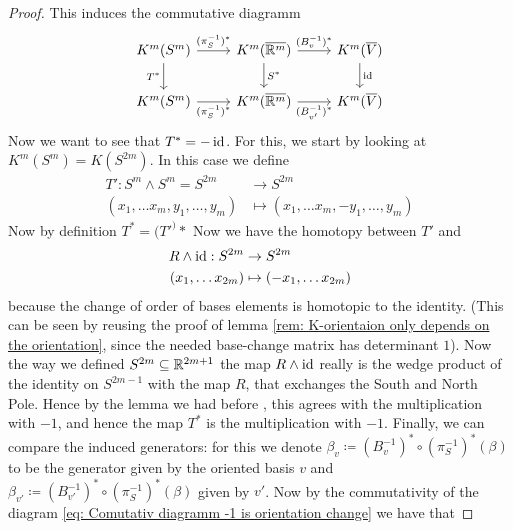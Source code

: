 \begin{proof}
    This induces the commutative diagramm 
    \begin{equation} \label{eq: Comutativ diagramm -1 is orientation change}
\begin{tikzcd}
K^m(S^m) \arrow[d, "T^*"'] \arrow[r, "(\pi_S^{-1})^*"] & K^m(\overline{\R^m}) \arrow[d, "S^*"] \arrow[r, "(B_{v}^{-1})^*"] & K^m(\overline{V}) \arrow[d, "\id"] \\
K^m(S^m) \arrow[r, "(\pi_S^{-1})^*"']                  & K^m(\overline{\R^m}) \arrow[r, "(B_{v'}^{-1})^*"']                & K^m(\overline{V})                 
\end{tikzcd}
    \end{equation}
Now we want to see that $T^*=-\operatorname{\mathrm{id}}$.
For this, we start by looking at $K^m(S^m)=K(S^{2m})$. In this case we define 
\begin{align*}
    T': S^m\wedge S^m =S^{2m}       & \to S^{2m}\\
    (x_1,\dots x_m,y_1,\dots, y_m)  & \mapsto (x_1,\dots x_m,-y_1,\dots, y_m)
\end{align*} Now by definition $T^*=(T'^)*$
Now we have the homotopy between $T'$ and 
\begin{align*}
    R\wedge \operatorname{\mathrm{id}} :S^{2m} & \to       S^{2m}\\
    (x_1,\dots x_{2m})  & \mapsto   (-x_1,\dots x_{2m})
\end{align*} because the change of order of bases elements is homotopic to the identity. (This can be seen by reusing the proof of lemma \ref{rem: K-orientaion only depends on the orientation}, since the needed base-change matrix has determinant $1$). Now the way we defined $S^{2m}\subseteq \mathbb{R}^{2m+1}$ the map $ R\wedge \operatorname{\mathrm{id}}$ really is the wedge product of the identity on $S^{2m-1}$ with the map $R$, that exchanges the South and North Pole. Hence by the lemma we had before , this agrees with the multiplication with $-1$, and hence the map $T^*$ is the multiplication with $-1$. 
Finally, we can compare the induced generators: for this we denote $\beta_v\coloneq (B_{v}^{-1})^*\circ (\pi^{-1}_S)^*(\beta)$ to be the generator given by the oriented basis $v$ and $\beta_{v'}\coloneq (B_{v'}^{-1})^*\circ (\pi^{-1}_S)^*(\beta)$ given by $v'$. Now by the commutativity of the diagram \ref{eq: Comutativ diagramm -1 is orientation change} we have that 

\end{proof}

